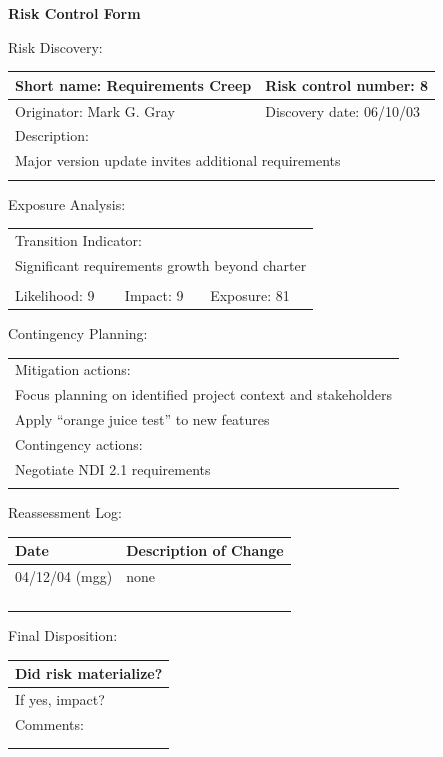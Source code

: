 \documentclass{article}
\begin{document}
\begin{center}\Large\bf
Risk Control Form
\end{center}
\vspace{24pt}

Risk Discovery:

\begin{tabular}{|p{211pt}|p{211pt}|} \hline
Short name: Requirements Creep & Risk control number: 8\\ \hline
Originator: Mark G. Gray & Discovery date: 06/10/03\\ \hline
\multicolumn{2}{|l|}{Description:} \\
\multicolumn{2}{|l|}{Major version update invites additional requirements} \\
\multicolumn{2}{|l|}{\mbox{}} \\ \hline
\end{tabular}
\vspace{24pt}

Exposure Analysis:

\begin{tabular}{|p{138pt}|p{138pt}|p{138pt}|} \hline
\multicolumn{3}{|l|}{Transition Indicator:} \\
\multicolumn{3}{|l|}{Significant requirements growth beyond charter} \\
\multicolumn{3}{|l|}{\mbox{}} \\ \hline
Likelihood: 9 & Impact: 9 & Exposure: 81\\ \hline
\end{tabular}
\vspace{24pt}

Contingency Planning:

\begin{tabular}{|p{433pt}|} \hline
Mitigation actions: \\
Focus planning on identified project context and stakeholders \\
Apply ``orange juice test'' to new features \\ \hline
Contingency actions: \\
Negotiate NDI 2.1 requirements \\
\mbox{} \\ \hline
\end{tabular}
\vspace{24pt}

Reassessment Log:

\begin{tabular}{|p{72pt}|p{351pt}|} \hline
Date & Description of Change \\ \hline
04/12/04 (mgg) & none \\ \hline
\mbox{} & \mbox{} \\ \hline
\mbox{} & \mbox{} \\ \hline
\mbox{} & \mbox{} \\ \hline
\mbox{} & \mbox{} \\ \hline
\end{tabular}
\vspace{24pt}

Final Disposition:

\begin{tabular}{|p{433pt}|} \hline
Did risk materialize? \\ \hline
If yes, impact? \\ \hline
Comments: \\
\mbox{} \\
\mbox{} \\ \hline
\end{tabular}
\end{document}
